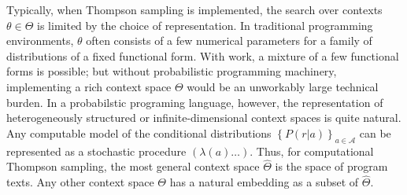 \documentclass{article} %
\newcommand{\Acal}{\mathcal{A}}
\newcommand{\br}[1]{\left\{ #1 \right\}}
\begin{document}
Typically, when Thompson sampling is implemented, the search over contexts $\theta \in \Theta$ is limited by the choice of representation.
In traditional programming environments, $\theta$ often consists of a few numerical parameters for a family of distributions of a fixed functional form.
With work, a mixture of a few functional forms is possible; but without probabilistic programming machinery, implementing a rich context space $\Theta$ would be an unworkably large technical burden.
In a probabilstic programing language, however, the representation of heterogeneously structured or infinite-dimensional context spaces is quite natural.
Any computable model of the conditional distributions $\br{P(r|a)}_{a \in \Acal}$ can be represented as a stochastic procedure $(\lambda (a) \ldots)$.
Thus, for computational Thompson sampling, the most general context space $\widehat\Theta$ is the space of program texts.
Any other context space $\Theta$ has a natural embedding as a subset of $\widehat\Theta$.
\end{document}
